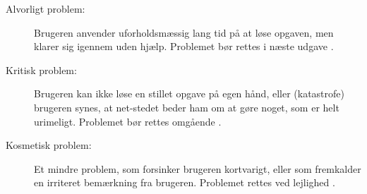 \begin{description}
  \item[Alvorligt problem:] Brugeren anvender uforholdsmæssig lang tid på at løse opgaven, men klarer sig igennem uden hjælp. Problemet bør rettes i næste udgave \cite{usabilitykat}.

\item[Kritisk problem:] Brugeren kan ikke løse en stillet opgave på egen hånd, eller (katastrofe) brugeren synes, at net-stedet beder ham om at gøre noget, som er helt urimeligt. Problemet bør rettes omgående \cite{usabilitykat}.

\item[Kosmetisk problem:] Et mindre problem, som forsinker brugeren kortvarigt, eller som fremkalder en irriteret bemærkning fra brugeren. Problemet rettes ved lejlighed \cite{usabilitykat}.
\end{description}

